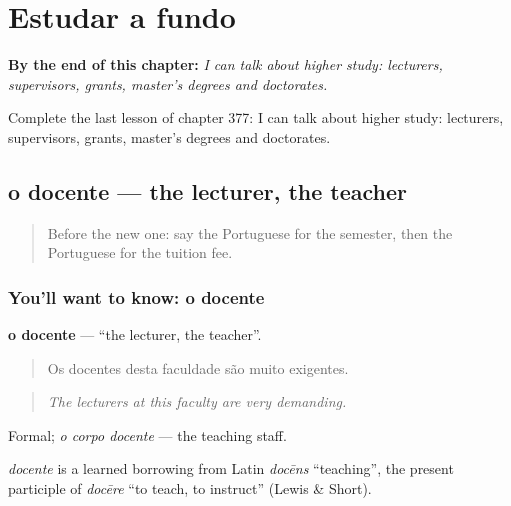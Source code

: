 
\chapter{Estudar a fundo}
\label{ch:pt-estudar-a-fundo}

\begin{chapteropening}
\textbf{By the end of this chapter:} \emph{I can talk about higher study: lecturers, supervisors, grants, master's degrees and doctorates.}

Complete the last lesson of chapter 377: I can talk about higher study: lecturers, supervisors, grants, master's degrees and doctorates.
\end{chapteropening}

\section[o docente]{o docente — the lecturer, the teacher}

\label{lesson:PT-C377-docente}



\begin{quote}
Before the new one: say the Portuguese for the semester, then the Portuguese for the tuition fee.
\end{quote}

\subsection*{You'll want to know: o docente}
\textbf{o docente} — \textquotedblleft{}the lecturer, the teacher\textquotedblright{}.

\begin{quote}
Os docentes desta faculdade são muito exigentes.
\end{quote}

\begin{quote}
\emph{The lecturers at this faculty are very demanding.}
\end{quote}

Formal; \emph{o corpo docente} — the teaching staff.

\begin{cousinweb}
\emph{docente} is a learned borrowing from Latin \emph{docēns} \textquotedblleft{}teaching\textquotedblright{}, the present participle of \emph{docēre} \textquotedblleft{}to teach, to instruct\textquotedblright{} (Lewis \& Short).
\end{cousinweb}

